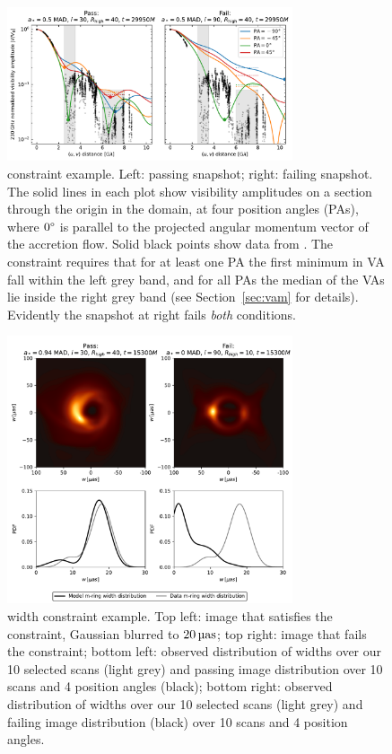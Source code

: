\begin{figure}
  \centering
  \includegraphics[width=0.75\textwidth]{figures/passfail_va.pdf}
  \caption{\vam constraint example.
    Left: passing snapshot; right: failing snapshot.
    The solid lines in each plot show visibility amplitudes on a section through the origin in the \uv domain, at four position angles (PAs), where $0\degree$ is parallel to the projected angular momentum vector of the accretion flow.
    Solid black points show data from \aprilvii.
    The \vam constraint requires that for at least one PA the first minimum in VA fall within the left grey band, and for all PAs the median of the VAs lie inside the right grey band (see Section~\ref{sec:vam} for details).
    Evidently the snapshot at right fails {\em both} conditions.
  }
  \label{fig:passfail_va}
\end{figure}

\begin{figure}
  \centering
  \includegraphics[width=0.75\textwidth]{figures/mring_width_example.pdf}
  \caption{\Mring width constraint example.
    Top left: image that satisfies the constraint, Gaussian blurred to $20\uas$; top right: image that fails the constraint; bottom left: observed distribution of \mring widths over our 10 selected scans (light grey) and passing image distribution over 10 scans and 4 position angles (black); bottom right: observed distribution of \mring widths over our 10 selected scans (light grey) and failing image distribution (black) over 10 scans and 4 position angles.
  }
  \label{fig:mring_width_example}
\end{figure}

